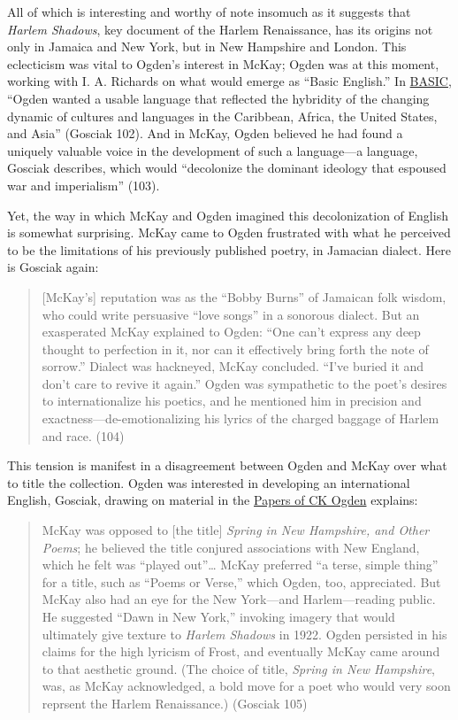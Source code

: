 \documentclass[
  12pt,
]{article}
\begin{document}
All of which is interesting and worthy of note insomuch as it suggests
that \emph{Harlem Shadows}, key document of the Harlem Renaissance, has
its origins not only in Jamaica and New York, but in New Hampshire and
London. This eclecticism was vital to Ogden's interest in McKay; Ogden
was at this moment, working with I. A. Richards on what would emerge as
``Basic English.'' In
\href{http://en.wikipedia.org/wiki/Basic_English}{BASIC}, ``Ogden wanted
a usable language that reflected the hybridity of the changing dynamic
of cultures and languages in the Caribbean, Africa, the United States,
and Asia'' (Gosciak 102). And in McKay, Ogden believed he had found a
uniquely valuable voice in the development of such a language---a
language, Gosciak describes, which would ``decolonize the dominant
ideology that espoused war and imperialism'' (103).

Yet, the way in which McKay and Ogden imagined this decolonization of
English is somewhat surprising. McKay came to Ogden frustrated with what
he perceived to be the limitations of his previously published poetry,
in Jamacian dialect. Here is Gosciak again:

\begin{quote}
{[}McKay's{]} reputation was as the ``Bobby Burns'' of Jamaican folk
wisdom, who could write persuasive ``love songs'' in a sonorous dialect.
But an exasperated McKay explained to Ogden: ``One can't express any
deep thought to perfection in it, nor can it effectively bring forth the
note of sorrow.'' Dialect was hackneyed, McKay concluded. ``I've buried
it and don't care to revive it again.'' Ogden was sympathetic to the
poet's desires to internationalize his poetics, and he mentioned him in
precision and exactness---de-emotionalizing his lyrics of the charged
baggage of Harlem and race. (104)
\end{quote}

This tension is manifest in a disagreement between Ogden and McKay over
what to title the collection. Ogden was interested in developing an
international English, Gosciak, drawing on material in the
\href{http://library.mcmaster.ca/archives/findaids/findaids/o/ogden.htm}{Papers
of CK Ogden} explains:

\begin{quote}
McKay was opposed to {[}the title{]} \emph{Spring in New Hampshire, and
Other Poems}; he believed the title conjured associations with New
England, which he felt was ``played out''\ldots{} McKay preferred ``a
terse, simple thing'' for a title, such as ``Poems or Verse,'' which
Ogden, too, appreciated. But McKay also had an eye for the New
York---and Harlem---reading public. He suggested ``Dawn in New York,''
invoking imagery that would ultimately give texture to \emph{Harlem
Shadows} in 1922. Ogden persisted in his claims for the high lyricism of
Frost, and eventually McKay came around to that aesthetic ground. (The
choice of title, \emph{Spring in New Hampshire}, was, as McKay
acknowledged, a bold move for a poet who would very soon reprsent the
Harlem Renaissance.) (Gosciak 105)
\end{quote}
\end{document}
